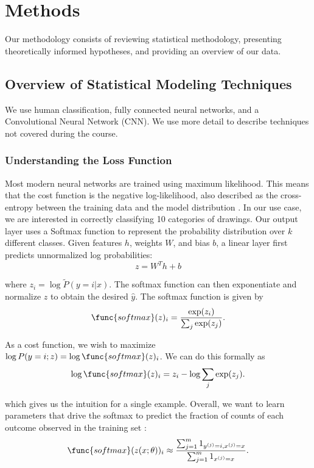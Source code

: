 \documentclass[11pt]{article}
\begin{document}
\section{Methods}

Our methodology consists of reviewing statistical methodology, presenting
theoretically informed hypotheses, and providing an overview of our data.

\subsection{Overview of Statistical Modeling Techniques}

We use human classification, fully connected neural networks,
and a Convolutional Neural Network (CNN). We use more detail to
describe techniques not covered during the course.

\subsubsection{Understanding the Loss Function}

Most modern neural networks are trained using maximum likelihood. This
means that the cost function is the negative log-likelihood, also
described as the cross-entropy between the training data and the model
distribution \cite{Goodfellow-et-al-2016}. In our use case, we are interested
in correctly classifying 10 categories of drawings. Our output layer
uses a Softmax function to represent the probability distribution over
$k$ different classes. Given features $h$, weights $W$, and bias $b$, a
linear layer first predicts unnormalized log probabilities:
\begin{equation}
  z = W^Th + b 
\end{equation}

where $z_i = \log \tilde{P}(y = i | x)$. The softmax function can then
exponentiate and normalize $z$ to obtain the desired $\hat{y}$. The
softmax function is given by
\begin{equation}
  \func{softmax}(z)_i = \frac{\exp(z_i)}{\sum_j \exp(z_j)}.
\end{equation}

As a cost function, we wish to maximize
$\log P(y=i; z) = \log \func{softmax}(z)_i$. We can do this formally as
\begin{equation}
  \log \func{softmax}(z)_i = z_i - \log \sum_j \exp(z_j).
\end{equation}

which gives us the intuition for a single example. Overall, we want to learn
parameters that drive the softmax to predict the fraction of counts of each
outcome observed in the training set \cite{Goodfellow-et-al-2016}:
\begin{equation}
  \func{softmax}(z(x;\theta))_i \approx \frac{\sum_{j=1}^m 1_{y^{(j)} = i,
      x^{(j)} = x}}{\sum_{j=1}^m 1_{x^{(j)} = x}}.
\end{equation}
\end{document}

